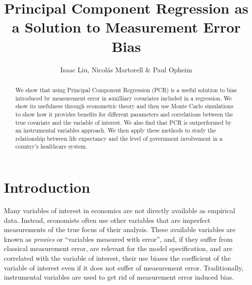 \documentclass[10pt]{article}
\begin{document}
    \thispagestyle{firststyle}

    \author{Isaac Liu, Nicol\'as Martorell \& Paul Opheim}
    \title{Principal Component Regression as a Solution to Measurement Error Bias} 
    \maketitle



    \begin{abstract}

        We show that using Principal Component Regression (PCR) is a useful solution to bias introduced by measurement error in auxilliary covariates included in a regression. We show its usefulness through econometric theory and then use Monte Carlo simulations to show how it provides benefits for different parameters and correlations between the true covariate and the variable of interest. We also find that PCR is outperformed by an instrumental variables approach. We then apply these methods to study the relationship between life expectancy and the level of government involvement in a country's healthcare system.
        
    \end{abstract}

    \newpage \clearpage

    \section*{Introduction}

        Many variables of interest in economics are not directly available as empirical data. Instead, economists often use other variables that are imperfect measurements of the true focus of their analysis. These available variables are known as \textit{proxies} or ``variables measured with error'', and, if they suffer from classical measurement error, are relevant for the model specification, and are correlated with the variable of interest, their use biases the coefficient of the variable of interest even if it does not suffer of measurement error. Traditionally, instrumental variables are used to get rid of measurement error induced bias.
\end{document}
